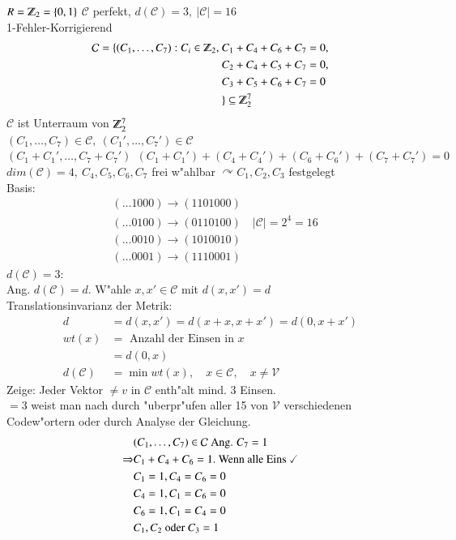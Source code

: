 $R=\Z_2=\lbrace 0,1 \rbrace$ $\mathcal{C}$ perfekt, $d(\mathcal{C})=3,\ \left| \mathcal{C} \right| = 16$ \\
1-Fehler-Korrigierend
\begin{align*}
\mathcal{C} = \lbrace (C_1,\ldots,C_7) : C_i \in \Z_2,\ &C_1 + C_4 + C_6 + C_7 = 0,\\
										&C_2 + C_4 + C_5 + C_7 = 0,\\
										&C_3 + C_5 + C_6 + C_7 = 0\\
										 &\rbrace \subseteq \Z_2^7
\end{align*}
$\mathcal{C}$ ist Unterraum von $\Z_2^7$ \\
$(C_1,\ldots,C_7) \in \mathcal{C},\ (C_1',\ldots,C_7') \in \mathcal{C}$ \\
$(C_1 + C_1',\ldots,C_7+C_7')\ \ (C_1+C_1') + (C_4+C_4') + (C_6+C_6') + (C_7+C_7') = 0$ \\
$dim(\mathcal{C})=4,\ C_4,C_5,C_6,C_7$ frei w"ahlbar $\curvearrowright C_1,C_2,C_3$ festgelegt \\
Basis:
\begin{align*}
	&(\ldots 1000) \rightarrow (1101000) \\
	&(\ldots 0100) \rightarrow (0110100) \quad \left| \mathcal{C} \right| =2^4 =16\\
	&(\ldots 0010) \rightarrow (1010010) \\
	&(\ldots 0001) \rightarrow (1110001)
\end{align*}
$d(\mathcal{C})=3:$\\
Ang. $d(\mathcal{C})=d$. W"ahle $x,x' \in \mathcal{C}$ mit $d(x,x')=d$\\
Translationsinvarianz der Metrik: \\
\begin{align*}
	d &=d(x,x')=d(x+x,x+x')=d(0,x+x') \\
	wt(x) &= \text{ Anzahl der Einsen in } x \\
	&= d(0,x)\\
	d(\mathcal{C}) &= \min wt(x),\quad x \in \mathcal{C},\quad x \neq \mathcal{V}
\end{align*}
Zeige: Jeder Vektor $\neq v$ in $\mathcal{C}$ enth"alt mind. 3 Einsen.\\
$= 3$ weist man nach durch "uberpr"ufen aller 15 von $\mathcal{V}$ verschiedenen Codew"ortern oder durch Analyse der Gleichung. 
\begin{align*}
	&(C_1,\ldots,C_7) \in \mathcal{C} \text{ Ang. } C_7=1 \\
	\Rightarrow &C_1+C_4+C_6=1. \text{ Wenn alle Eins } \checked \\
	&C_1=1,C_4=C_6=0\\
	&C_4=1,C_1=C_6=0\\
	&C_6=1,C_1=C_4=0\\
	&C_1, C_2\text{ oder } C_3 = 1
\end{align*}
